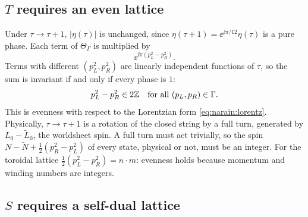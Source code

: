\subsection{\texorpdfstring{$T$}{T} requires an even lattice}

Under $\tau\to\tau+1$, $|\eta(\tau)|$ is unchanged, since $\eta(\tau+1)=\ee^{\ii\pi/12}\eta(\tau)$
is a pure phase. Each term of $\Theta_\Gamma$ is multiplied by
\begin{equation}
 \ee^{\ii\pi(p_L^2-p_R^2)} .
\end{equation}
Terms with different $(p_L^2,p_R^2)$ are linearly independent functions of $\tau$, so the sum
is invariant if and only if every phase is $1$:
\begin{equation}\label{eq:narain:Tcondition}
 p_L^2-p_R^2\in2\mathbb{Z}\quad\text{for all }(p_L,p_R)\in\Gamma .
\end{equation}
This is evenness with respect to the Lorentzian form \eqref{eq:narain:lorentz}. Physically,
$\tau\to\tau+1$ is a rotation of the closed string by a full turn, generated by
$L_0-\tilde L_0$, the worldsheet spin. A full turn must act trivially, so the spin
$N-\tilde N+\frac12(p_R^2-p_L^2)$ of every state, physical or not, must be an integer. For the
toroidal lattice $\frac12(p_L^2-p_R^2)=n\cdot m$: evenness holds because momentum and winding
numbers are integers.

\subsection{\texorpdfstring{$S$}{S} requires a self-dual lattice}

